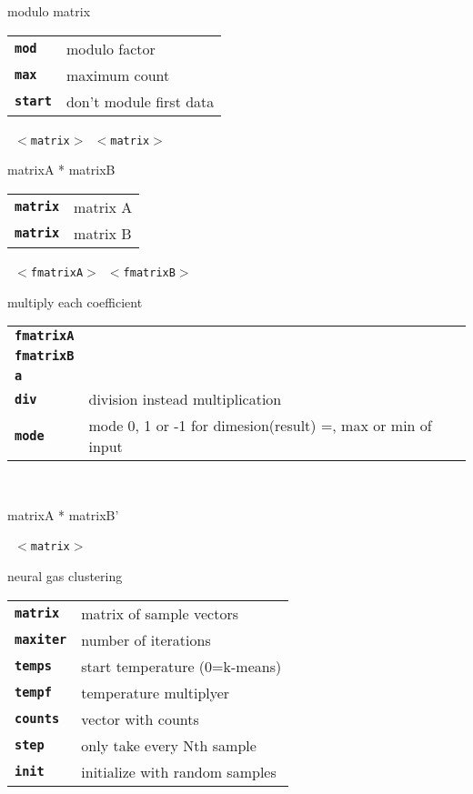 \begin{description}
\begin{description}
        modulo matrix

      \begin{tabular}{ll}
 \texttt{\textbf{mod}} &    modulo factor  \\
 \texttt{\textbf{max}} &    maximum count  \\
 \texttt{\textbf{start}} &  don't module first data  \\
      \end{tabular}
       \texttt{ $<$matrix$>$ $<$matrix$>$} \

        matrixA * matrixB

      \begin{tabular}{ll}
 \texttt{\textbf{matrix}} &  matrix A \\
 \texttt{\textbf{matrix}} &  matrix B \\
      \end{tabular}
       \texttt{ $<$fmatrixA$>$ $<$fmatrixB$>$   } \

        multiply each coefficient

      \begin{tabular}{ll}
 \texttt{\textbf{fmatrixA}} &  \\
 \texttt{\textbf{fmatrixB}} &  \\
 \texttt{\textbf{a}} &            \\
 \texttt{\textbf{div}} &        division instead multiplication  \\
 \texttt{\textbf{mode}} &       mode 0, 1 or -1 for dimesion(result) =, max or min of input  \\
      \end{tabular}
       \texttt{} \

        matrixA * matrixB'

       \texttt{ $<$matrix$>$      } \

        neural gas clustering

      \begin{tabular}{ll}
 \texttt{\textbf{matrix}} &  matrix of sample vectors \\
 \texttt{\textbf{maxiter}} &  number of iterations  \\
 \texttt{\textbf{temps}} &    start temperature (0=k-means)  \\
 \texttt{\textbf{tempf}} &    temperature multiplyer  \\
 \texttt{\textbf{counts}} &   vector with counts \\
 \texttt{\textbf{step}} &     only take every Nth sample  \\
 \texttt{\textbf{init}} &     initialize with random samples  \\
      \end{tabular}
       \texttt{   } \


\end{description}
\end{description}
